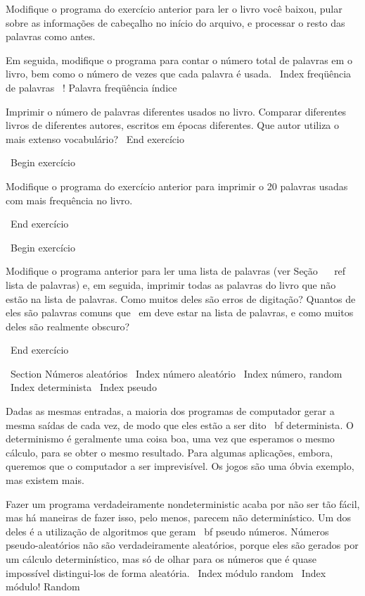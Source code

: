 \documentclass[10pt]{book}
\begin{document}
{{{{{{{{{Modifique o programa do exercício anterior para ler o livro
você baixou, pular sobre as informações de cabeçalho no início
do arquivo, e processar o resto das palavras como antes.

Em seguida, modifique o programa para contar o número total de palavras em
o livro, bem como o número de vezes que cada palavra é usada.
\ Index {freqüência de palavras}
\ {! Palavra freqüência} índice

Imprimir o número de palavras diferentes usados ​​no livro. Comparar
diferentes livros de diferentes autores, escritos em épocas diferentes.
Que autor utiliza o mais extenso vocabulário?
\ End {} exercício


\ Begin {} exercício

Modifique o programa do exercício anterior para imprimir o
20 palavras usadas com mais frequência no livro.

\ End {} exercício


\ Begin {} exercício

Modifique o programa anterior para ler uma lista de palavras (ver
Seção ~ \ ref {lista de palavras}) e, em seguida, imprimir todas as palavras do livro que
não estão na lista de palavras. Como muitos deles são erros de digitação? Quantos de
eles são palavras comuns que {\ em} deve estar na lista de palavras, e como
muitos deles são realmente obscuro?

\ End {} exercício


\ Section {Números aleatórios}
\ Index {número aleatório}
\ Index {número, random}
\ Index {} determinista
\ Index {pseudo}

Dadas as mesmas entradas, a maioria dos programas de computador gerar a mesma
saídas de cada vez, de modo que eles estão a ser dito {\ bf determinista}.
O determinismo é geralmente uma coisa boa, uma vez que esperamos o mesmo
cálculo, para se obter o mesmo resultado. Para algumas aplicações, embora,
queremos que o computador a ser imprevisível. Os jogos são uma óbvia
exemplo, mas existem mais.

Fazer um programa verdadeiramente nondeterministic acaba por não ser tão fácil,
mas há maneiras de fazer isso, pelo menos, parecem não determinístico. Um dos
deles é a utilização de algoritmos que geram {\ bf pseudo} números.
Números pseudo-aleatórios não são verdadeiramente aleatórios, porque eles são gerados
por um cálculo determinístico, mas só de olhar para os números que
é quase impossível distingui-los de forma aleatória.
\ Index {módulo random}
\ Index {módulo! Random}

}}}}}}}}}
\end{document}
